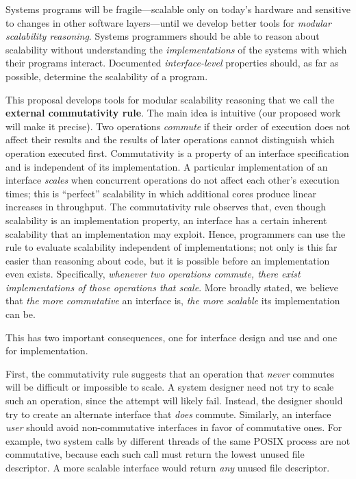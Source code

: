 Systems programs will be fragile---scalable only on today's
hardware and sensitive to changes in other software layers---until we
develop better tools for \emph{modular scalability
  reasoning}.
%
Systems programmers should be able to reason about scalability
without understanding the \emph{implementations} of
the systems with which their programs interact.
%
Documented \emph{interface-level} properties should, as far as
possible, determine the scalability of a program.

This proposal develops tools for modular scalability reasoning that
we call the \textbf{external commutativity rule}.
%
The main idea is intuitive (our proposed work will make it precise).
%
Two operations \emph{commute} if their order of execution does not
affect their results and the results of
later operations cannot distinguish which operation executed first.
%
Commutativity is a property of an interface specification
and is independent of its
implementation.  A particular implementation of an interface
\emph{scales} when concurrent operations do not affect each other's
execution times; this is ``perfect'' scalability in which
additional cores produce linear increases in throughput.
The commutativity rule observes that, even though
scalability is an implementation property, an interface has a certain
inherent scalability that an implementation may exploit.
Hence, programmers can use the rule to evaluate scalability
independent of implementations; not only is this far easier than
reasoning about code, but it is possible before an implementation even
exists.
%
Specifically, \emph{whenever two
operations commute, there exist implementations of those operations that
scale}.
%
More broadly stated, we believe that \emph{the more commutative} an
interface is, \emph{the more scalable} its implementation can be.

This has two important consequences, one for interface design and use
and one for implementation.

First, the commutativity rule suggests that an operation that
\emph{never} commutes will be difficult or impossible to scale.
%
A system designer need not try to scale such an operation, since the
attempt will likely fail.
%
Instead, the designer should try to create an alternate interface that
\emph{does} commute.
%
Similarly, an interface \emph{user} should avoid non-commutative
interfaces in favor of commutative ones.
%
For example, two  system calls by different threads of
the same POSIX process are not commutative, because each such call
must return the lowest unused file descriptor.
%
A more scalable  interface would return \emph{any}
unused file descriptor.

